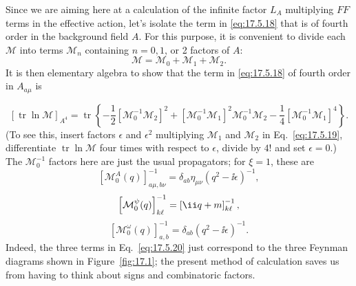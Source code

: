 Since we are aiming here at a calculation of the infinite factor $L_A$
multiplying $FF$ terms in the effective action, let's isolate the term in
\eqref{eq:17.5.18} that is of fourth order in the background field $A$. For
this purpose, it is convenient to divide each $\mathcal M$ into terms
$\mathcal M_n$ containing $n=0,1$, or 2 factors of $A$:
\begin{equation}
\mathcal M=\mathcal M_0+\mathcal M_1+\mathcal M_2.
\label{eq:17.5.19}
\end{equation}
It is then elementary algebra to show that the term in
\eqref{eq:17.5.18} of fourth order in $A_{a\mu}$ is



\begin{equation}
\left[\operatorname{tr}\ln\mathcal M\right]_{A^4}
=\operatorname{tr}\left\{-\frac12\left[\mathcal M_0^{-1}\mathcal M_2\right]^2
+\left[\mathcal M_0^{-1}\mathcal M_1\right]^2\mathcal M_0^{-1}\mathcal M_2
-\frac14\left[\mathcal M_0^{-1}\mathcal M_1\right]^4\right\}.
\label{eq:17.5.20}
\end{equation}
(To see this, insert factors $\epsilon$ and $\epsilon^2$ multiplying
$\mathcal M_1$ and $\mathcal M_2$ in Eq.~\eqref{eq:17.5.19}, differentiate
$\operatorname{tr}\ln\mathcal M$ four times with respect to $\epsilon$, divide
by $4!$ and set $\epsilon=0$.) The $\mathcal M_0^{-1}$ factors here are just
the usual propagators; for $\xi=1$, these are
\begin{equation}
\left[\mathcal M_0^A(q)\right]^{-1}_{a\mu,b\nu}
=\delta_{ab}\eta_{\mu\nu}(q^2-\ii\epsilon)^{-1},
\label{eq:17.5.21}
\end{equation}
\begin{equation}
\left[\mathcal M_0^\psi(q)\right]^{-1}_{k\ell}
=\left[\ii\sl q+m\right]^{-1}_{k\ell},
\label{eq:17.5.22}
\end{equation}
\begin{equation}
\left[\mathcal M_0^\omega(q)\right]^{-1}_{a,b}
=\delta_{ab}(q^2-\ii\epsilon)^{-1}.
\label{eq:17.5.23}
\end{equation}
Indeed, the three terms in Eq.~\eqref{eq:17.5.20} just correspond to the
three Feynman diagrams shown in Figure~\ref{fig:17.1}; the present method
of calculation saves us from having to think about signs and combinatoric
factors.


